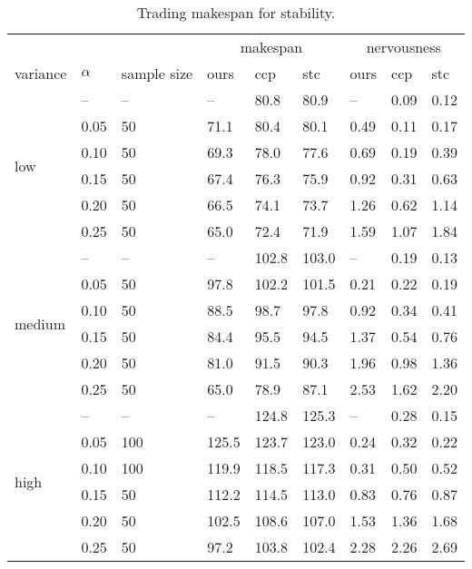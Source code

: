 	\begin{table}
 	\centering
 	\begin{tabular}{l l l | l l l | l l l}
 	\hline
 			 			& 		   & 			   & \multicolumn{3}{c}{makespan} & \multicolumn{3}{c}{nervousness} \\
   	variance			& $\alpha$ & sample size   & ours   &   ccp &   stc			&  ours  &  ccp   & stc \\
   	\hline
 	\multirow{6}{*}{low}&  --      &  --		   & --    & 80.8  & 80.9			& --    & 0.09   & 0.12 \\
 						&  0.05	   &  50		   & 71.1  & 80.4  & 80.1			& 0.49  & 0.11   & 0.17 \\
 						&  0.10	   &  50		   & 69.3  & 78.0  & 77.6			& 0.69  & 0.19   & 0.39 \\
   						&  0.15	   &  50		   & 67.4  & 76.3  & 75.9			& 0.92  & 0.31   & 0.63 \\
  						&  0.20	   &  50		   & 66.5  & 74.1  & 73.7			& 1.26  & 0.62   & 1.14 \\
  						&  0.25	   &  50		   & 65.0  & 72.4  & 71.9			& 1.59  & 1.07   & 1.84 \\
   	\hline
 	\multirow{6}{*}{medium}&  --      &  --		   & --    & 102.8  & 103.0			& --    & 0.19   & 0.13 \\
 						&  0.05	   &  50		   & 97.8  & 102.2  & 101.5			& 0.21  & 0.22   & 0.19 \\
 						&  0.10	   &  50		   & 88.5  & 98.7  & 97.8			& 0.92  & 0.34   & 0.41 \\
   						&  0.15	   &  50		   & 84.4  & 95.5  & 94.5			& 1.37  & 0.54   & 0.76 \\
  						&  0.20	   &  50		   & 81.0  & 91.5  & 90.3			& 1.96  & 0.98   & 1.36 \\
  						&  0.25	   &  50		   & 65.0  & 78.9  & 87.1			& 2.53  & 1.62   & 2.20 \\
   	\hline
   	\multirow{6}{*}{high}&  --      &  --		   & --    & 124.8  & 125.3			& --    & 0.28   & 0.15 \\
 						&  0.05	   &  100		   & 125.5  & 123.7  & 123.0		& 0.24  & 0.32   & 0.22 \\
 						&  0.10	   &  100		   & 119.9  & 118.5  & 117.3		& 0.31  & 0.50   & 0.52 \\
   						&  0.15	   &  50		   & 112.2  & 114.5  & 113.0		& 0.83  & 0.76   & 0.87 \\
  						&  0.20	   &  50		   & 102.5  & 108.6  & 107.0		& 1.53  & 1.36   & 1.68 \\
  						&  0.25	   &  50		   & 97.2  & 103.8  & 102.4			& 2.28  & 2.26   & 2.69 \\
  	\hline 		
   	\end{tabular}
  	\caption{Trading makespan for stability.}
  	\end{table}
 	
